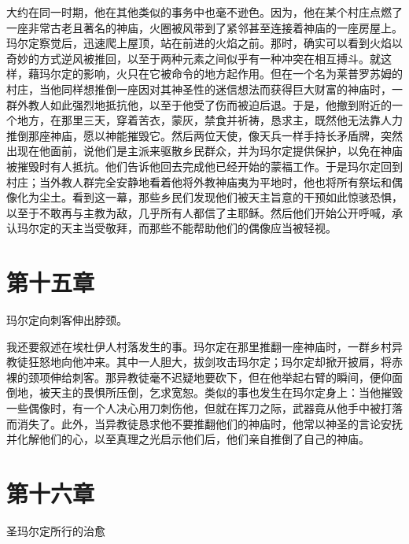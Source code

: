大约在同一时期，他在其他类似的事务中也毫不逊色。因为，他在某个村庄点燃了一座非常古老且著名的神庙，火圈被风带到了紧邻甚至连接着神庙的一座房屋上。玛尔定察觉后，迅速爬上屋顶，站在前进的火焰之前。那时，确实可以看到火焰以奇妙的方式逆风被推回，以至于两种元素之间似乎有一种冲突在相互搏斗。就这样，藉玛尔定的影响，火只在它被命令的地方起作用。\newline{}但在一个名为莱普罗苏姆的村庄，当他同样想推倒一座因对其神圣性的迷信想法而获得巨大财富的神庙时，一群外教人如此强烈地抵抗他，以至于他受了伤而被迫后退。于是，他撤到附近的一个地方，在那里三天，穿着苦衣，蒙灰，禁食并祈祷，恳求主，既然他无法靠人力推倒那座神庙，愿以神能摧毁它。然后两位天使，像天兵一样手持长矛盾牌，突然出现在他面前，说他们是主派来驱散乡民群众，并为玛尔定提供保护，以免在神庙被摧毁时有人抵抗。他们告诉他回去完成他已经开始的蒙福工作。于是玛尔定回到村庄；当外教人群完全安静地看着他将外教神庙夷为平地时，他也将所有祭坛和偶像化为尘土。看到这一幕，那些乡民们发现他们被天主旨意的干预如此惊骇恐惧，以至于不敢再与主教为敌，几乎所有人都信了主耶稣。然后他们开始公开呼喊，承认玛尔定的天主当受敬拜，而那些不能帮助他们的偶像应当被轻视。\par


\section{第十五章}

玛尔定向刺客伸出脖颈。\par

我还要叙述在埃杜伊人村落发生的事。玛尔定在那里推翻一座神庙时，一群乡村异教徒狂怒地向他冲来。其中一人胆大，拔剑攻击玛尔定；玛尔定却掀开披肩，将赤裸的颈项伸给刺客。那异教徒毫不迟疑地要砍下，但在他举起右臂的瞬间，便仰面倒地，被天主的畏惧所压倒，乞求宽恕。类似的事也发生在玛尔定身上：当他摧毁一些偶像时，有一个人决心用刀刺伤他，但就在挥刀之际，武器竟从他手中被打落而消失了。此外，当异教徒恳求他不要推翻他们的神庙时，他常以神圣的言论安抚并化解他们的心，以至真理之光启示他们后，他们亲自推倒了自己的神庙。\par


\section{第十六章}

圣玛尔定所行的治愈\par

